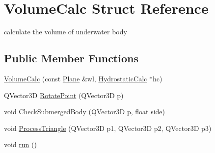 \hypertarget{structVolumeCalc}{\section{Volume\-Calc Struct Reference}
\label{structVolumeCalc}
}


calculate the volume of underwater body  


\subsection*{Public Member Functions}
\begin{DoxyCompactItemize}
\item 
\hyperlink{structVolumeCalc_a21a672444dafcae8293fe2b8be4dc071}{Volume\-Calc} (const \hyperlink{classShipCAD_1_1Plane}{Plane} \&wl, \hyperlink{classShipCAD_1_1HydrostaticCalc}{Hydrostatic\-Calc} $\ast$hc)
\item 
Q\-Vector3\-D \hyperlink{structVolumeCalc_ac075a2bc2a2a39a3e89c8b3184bea996}{Rotate\-Point} (Q\-Vector3\-D p)
\item 
void \hyperlink{structVolumeCalc_a76b82a9e1e96365185536a8fc799e235}{Check\-Submerged\-Body} (Q\-Vector3\-D p, float side)
\item 
void \hyperlink{structVolumeCalc_ae4d9b88d4538df112bdf297a3c6364b8}{Process\-Triangle} (Q\-Vector3\-D p1, Q\-Vector3\-D p2, Q\-Vector3\-D p3)
\item 
void \hyperlink{structVolumeCalc_a9dc91b671e810b1bd4236565a89caf05}{run} ()
\end{DoxyCompactItemize}
